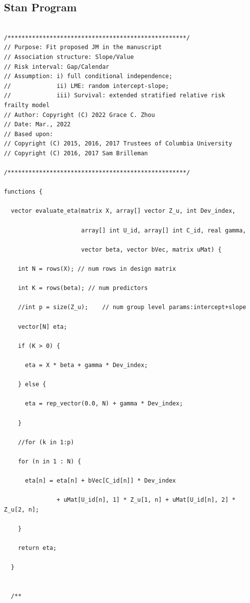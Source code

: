 \subsection{Stan Program}
\begin{SingleSpace}
    \begin{verbatim}

/***************************************************/
// Purpose: Fit proposed JM in the manuscript  
// Association structure: Slope/Value
// Risk interval: Gap/Calendar
// Assumption: i) full conditional independence; 
//             ii) LME: random intercept-slope; 
//             iii) Survival: extended stratified relative risk frailty model
// Author: Copyright (C) 2022 Grace C. Zhou
// Date: Mar., 2022
// Based upon:
// Copyright (C) 2015, 2016, 2017 Trustees of Columbia University
// Copyright (C) 2016, 2017 Sam Brilleman

/***************************************************/

functions {

  vector evaluate_eta(matrix X, array[] vector Z_u, int Dev_index,

                      array[] int U_id, array[] int C_id, real gamma,

                      vector beta, vector bVec, matrix uMat) {

    int N = rows(X); // num rows in design matrix

    int K = rows(beta); // num predictors

    //int p = size(Z_u);    // num group level params:intercept+slope

    vector[N] eta;

    if (K > 0) {

      eta = X * beta + gamma * Dev_index;

    } else {

      eta = rep_vector(0.0, N) + gamma * Dev_index;

    }

    //for (k in 1:p)

    for (n in 1 : N) {

      eta[n] = eta[n] + bVec[C_id[n]] * Dev_index

               + uMat[U_id[n], 1] * Z_u[1, n] + uMat[U_id[n], 2] * Z_u[2, n];

    }

    return eta;

  }

  
  /** 


\end{verbatim}
\end{SingleSpace}
